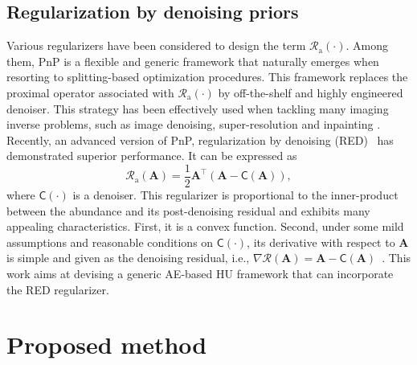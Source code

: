 \documentclass[journal,a4paper]{IEEEtran}
\newcommand{\MATabund}{\mathbf{A}}
\begin{document}
\subsection{Regularization by denoising priors}
Various regularizers have been considered to design the term $\mathcal{R}_{\mathrm{a}}(\cdot)$. Among them, PnP is a flexible and generic framework that naturally emerges when resorting to splitting-based optimization procedures. This framework replaces the proximal operator associated with $\mathcal{R}_{\mathrm{a}}(\cdot)$ by off-the-shelf and highly engineered denoiser. This strategy has been effectively used when tackling many imaging inverse problems, such as image denoising, super-resolution and inpainting \cite{lai2022deep,dian2020regularizing}. Recently, an advanced version of PnP, regularization by denoising (RED)~\cite{romano2017little} has demonstrated superior performance. It can be expressed as
\begin{equation}\label{eq.red}
  \mathcal{R}_{\mathrm{a}}(\MATabund)= \frac{1}{2}\MATabund^{\top}\left(\MATabund-\mathsf{C}\left(\MATabund\right)\right),
\end{equation}
where $\mathsf{C}(\cdot)$ is a denoiser. This regularizer is proportional to the inner-product between the abundance and its post-denoising residual and exhibits many appealing characteristics. First, it is a convex function. Second, under some mild assumptions and reasonable conditions on $\mathsf{C}(\cdot)$, its derivative with respect to $\MATabund$ is simple and given as the denoising residual, i.e., $\nabla\mathcal{R}(\MATabund)=\MATabund-\mathsf{C}\left(\MATabund\right)$~\cite{romano2017little}. This work aims at devising a generic AE-based HU framework that can incorporate the RED regularizer.

\section{Proposed method}
\label{sec:proposed}
\end{document}
